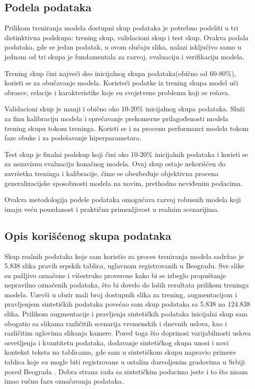 \documentclass[a4paper,12pt]{article}
\begin{document}
	\subsection{Podela podataka}
	Prilikom treniranja modela dostupni skup podataka je potrebno podeliti u tri distinktivna podskupa: trening skup, validacioni skup i test skup. Ovakva podala podataka, gde se jedan podatak, u ovom slučaju slika, nalazi isključivo samo u jednom od tri skupa je fundamentala za razvoj, evaluaciju i verifikaciju modela.
	
	Trening skup čini najveći deo inicijalnog skupa podataka(obično od 60-80\%), koristi se za obučavanje modela. Koristeći podatke iz trening skupa model uči obrasce, relacije i karakteristike koje su svojstvene problemu koji se rešava.
	
	Validacioni skup je manji i obično oko 10-20\% inicijalnog skupa podataka. Služi za finu kalibraciju modela i sprečavanje prekomerne prilagođenosti modela trening skupu tokom treninga. Koristi se i za procenu performanci modela tokom faze obuke i za podešavanje hiperparametara.
	
	Test skup je finalni podskup koji čini oko 10-20\% inicijalnih podataka i koristi se za nezavisnu evaluaciju konačnog modela. Ovaj skup ostaje nekorišćen do završetka treninga i kalibracije, čime se obezbeđuje objektivna procena generalizacijske sposobnosti modela na novim, prethodno neviđenim podacima.
	
	Ovakva metodologija podele podataka omogućava razvoj robusnih modela koji imaju veću pouzdanost i praktičnu primenljivost u realnim scenarijima.
	
	\subsection{Opis korišćenog skupa podataka}
	Skup realnih podataka koje sam koristio za proces treniranja modela sadržao je 5.838 slika pravih srpskih tablica, uglavnom registrovanih u Beogradu. Sve slike su pažljivo označene i višestruko proverene kako bi se izbeglo propuštanje nepravilno označenih podataka, što bi dovelo do loših rezultata prilikom treninga modela. Uzevši u obzir mali broj dostupnih slika za trening, augmentacijom i pravljenjem sintetičkih podataka povećao sam skup podataka sa 5.838 na 124.838 slika. Prilikom augmentacije i pravljenja sintetičkih podataka inicijalni skup sam obogatio sa slikama različitih scenarija vremenskih i dnevnih uslova, kao i različitim uglovima slikanja kamere. Pored toga što doprinosi varijabilnosti uslova osvetljenja i kvantitetu podataka, dodavanje sintetičkog skupa unosi i novi kontekst teksta na tablicama, gde sam u sintetičkom skupu napravio primere tablica koje su mogle biti registrovane u ostalim dozvoljenim gradovima u Srbiji pored Beograda \cite{superRegistracija}. Dobra strana rada sa sintetičkim podacima jeste i to što nisam imao ručnu fazu označavanja podataka.
	\newpage
	
\end{document}
